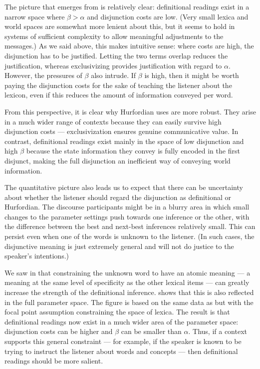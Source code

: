 \documentclass[12pt,twoside]{article}
\renewcommand{\_}{\textbf{\textunderscore\hspace{-4pt}\textunderscore\hspace{-3pt}\textunderscore\hspace{-4pt}\textunderscore}\hspace{0.5pt}}			%
\begin{document}
The picture that emerges from  is relatively clear:
definitional readings exist in a narrow space where $\beta > \alpha$
and disjunction costs are low. (Very small lexica and world spaces are
somewhat more lenient about this, but it seems to hold in systems of
sufficient complexity to allow meaningful adjustments to the
messages.) As we said above, this makes intuitive sense: where costs
are high, the disjunction has to be justified. Letting the two terms
overlap reduces the justification, whereas exclusivizing provides
justification with regard to $\alpha$. However, the pressures of
$\beta$ also intrude. If $\beta$ is high, then it might be worth
paying the disjunction costs for the sake of teaching the listener
about the lexicon, even if this reduces the amount of information
conveyed per word.

From this perspective, it is clear why Hurfordian uses are more
robust. They arise in a much wider range of contexts because they can
easily survive high disjunction costs --- exclusivization ensures
genuine communicative value. In contrast, definitional readings exist
mainly in the space of low disjunction and high $\beta$ because the
state information they convey is fully encoded in the first disjunct,
making the full disjunction an inefficient way of conveying world
information.

The quantitative picture also leads us to expect that there can be
uncertainty about whether the listener should regard the disjunction
as definitional or Hurfordian. The discourse participants might be in
a blurry area in which small changes to the parameter settings push
towards one inference or the other, with the difference between the
best and next-best inferences relatively small. This can persist even
when one of the words is unknown to the listener. (In such cases, the
disjunctive meaning is just extremely general and will not do justice
to the speaker's intentions.)

We saw in  that constraining the
unknown word to have an atomic meaning --- a meaning at the same level
of specificity as the other lexical items --- can greatly increase the
strength of the definitional inference.   shows
that this is also reflected in the full parameter space. The figure is
based on the same data as  but with the focal point
assumption constraining the space of lexica. The result is that
definitional readings now exist in a much wider area of the parameter
space: disjunction costs can be higher and $\beta$ can be smaller than
$\alpha$. Thus, if a context supports this general constraint --- for
example, if the speaker is known to be trying to instruct the listener
about words and concepts --- then definitional readings should be more
salient.
\end{document}
